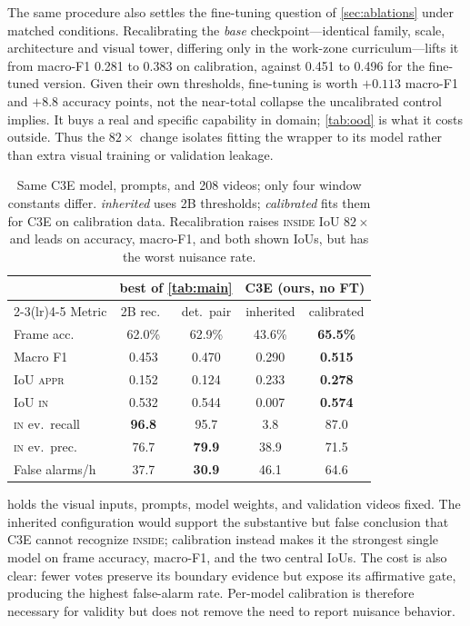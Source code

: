 \documentclass[journal]{IEEEtran}
\begin{document}
The same procedure also settles the fine-tuning question of \cref{sec:ablations} under matched conditions.  Recalibrating the \emph{base} checkpoint---identical family, scale, architecture and visual tower, differing only in the work-zone curriculum---lifts it from macro-F1 0.281 to 0.383 on calibration, against 0.451 to 0.496 for the fine-tuned version.  Given their own thresholds, fine-tuning is worth $+0.113$ macro-F1 and $+8.8$ accuracy points, not the near-total collapse the uncalibrated control implies.  It buys a real and specific capability in domain; \cref{tab:ood} is what it costs outside.  Thus the $82\times$ change isolates fitting the wrapper to its model rather than extra visual training or validation leakage.

\begin{table}[t]
\centering
\caption{Same C3E model, prompts, and 208 videos; only four window constants differ.  \emph{inherited} uses 2B thresholds; \emph{calibrated} fits them for C3E on calibration data.  Recalibration raises \textsc{inside} IoU $82\times$ and leads on accuracy, macro-F1, and both shown IoUs, but has the worst nuisance rate.}
\label{tab:worldmodel}
\footnotesize
\setlength{\tabcolsep}{3pt}
\begin{tabular}{@{}lcccc@{}}
\toprule
& \multicolumn{2}{c}{best of \cref{tab:main}} & \multicolumn{2}{c}{C3E (ours, no FT)} \\
\cmidrule(lr){2-3}\cmidrule(lr){4-5}
Metric & 2B rec.\ & det.\ pair & inherited & calibrated \\
\midrule
Frame acc.\ & 62.0\% & 62.9\% & 43.6\% & \textbf{65.5\%} \\
Macro F1 & 0.453 & 0.470 & 0.290 & \textbf{0.515} \\
IoU \textsc{appr} & 0.152 & 0.124 & 0.233 & \textbf{0.278} \\
IoU \textsc{in} & 0.532 & 0.544 & 0.007 & \textbf{0.574} \\
\textsc{in} ev.\ recall & \textbf{96.8} & 95.7 & 3.8 & 87.0 \\
\textsc{in} ev.\ prec.\ & 76.7 & \textbf{79.9} & 38.9 & 71.5 \\
False alarms/h & 37.7 & \textbf{30.9} & 46.1 & 64.6 \\
\bottomrule
\end{tabular}
\end{table}

 holds the visual inputs, prompts, model weights, and validation videos fixed.  The inherited configuration would support the substantive but false conclusion that C3E cannot recognize \textsc{inside}; calibration instead makes it the strongest single model on frame accuracy, macro-F1, and the two central IoUs.  The cost is also clear: fewer votes preserve its boundary evidence but expose its affirmative gate, producing the highest false-alarm rate.  Per-model calibration is therefore necessary for validity but does not remove the need to report nuisance behavior.
\end{document}
